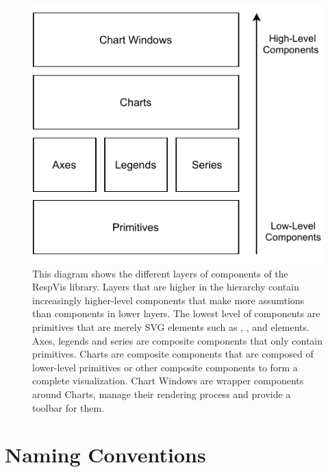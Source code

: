 \begin{figure}[tp]
\centering
\includegraphics[keepaspectratio,width=\linewidth,height=\fullh / 3]{diagrams/respvis-layers.pdf}
\caption[Component Layers of RespVis]{
  This diagram shows the different layers of components of the RespVis library.
  Layers that are higher in the hierarchy contain increasingly higher-level components that make more assumtions than components in lower layers.
  The lowest level of components are primitives that are merely SVG elements such as , , and  elements.
  Axes, legends and series are composite components that only contain primitives.
  Charts are composite components that are composed of lower-level primitives or other composite components to form a complete visualization.
  Chart Windows are wrapper components around Charts, manage their rendering process and provide a toolbar for them.  
}
\label{fig:Layers}
\end{figure}





\section{Naming Conventions}
\label{sec:NamingConventions}

